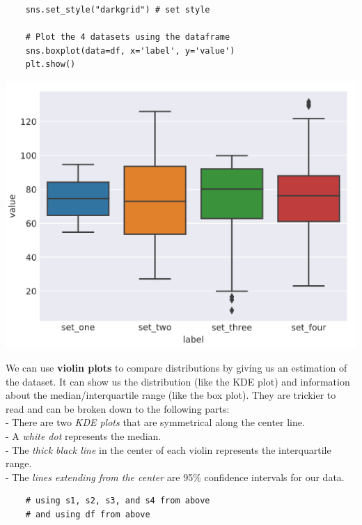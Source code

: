 \documentclass[11pt, a4paper]{article}
\begin{document}
\begin{spacing}{1.1}
\begin{minipage}[c]{10.3cm}
\begin{lstlisting}
	sns.set_style("darkgrid") # set style
	
	# Plot the 4 datasets using the dataframe
	sns.boxplot(data=df, x='label', y='value')
	plt.show()	\end{lstlisting}\vspace*{1mm}
	\end{minipage}
	\begin{minipage}[c]{10cm}
		\includegraphics[scale=.48]{bpdist}
	\end{minipage} \newpage
	
	\noindent We can use \textbf{violin plots} to compare distributions by giving us an estimation of the dataset. It can show us the distribution (like the KDE plot) and information about the median/interquartile range (like the box plot). They are trickier to read and can be broken down to the following parts: \\
	\hspace*{3mm} - There are two \textit{KDE plots} that are symmetrical along the center line. \\
	\hspace*{3mm} - A \textit{white dot} represents the median. \\
	\hspace*{3mm} - The \textit{thick black line} in the center of each violin represents the interquartile range. \\
	\hspace*{3mm} - The \textit{lines extending from the center} are 95\% confidence intervals for our data. \\
	\begin{minipage}[c]{10.3cm}
	\begin{lstlisting}
	# using s1, s2, s3, and s4 from above
	# and using df from above
	

\end{lstlisting}
\end{minipage}
\end{spacing}
\end{document}
